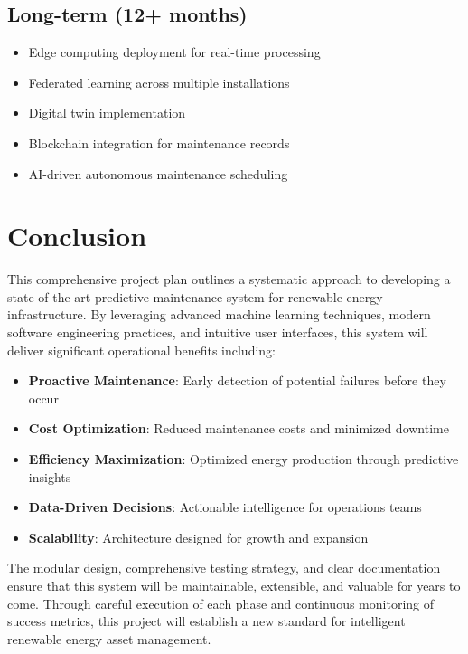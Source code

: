 \documentclass[12pt,a4paper]{article}
\begin{document}
\subsection{Long-term (12+ months)}
\begin{itemize}[leftmargin=*]
    \item Edge computing deployment for real-time processing
    \item Federated learning across multiple installations
    \item Digital twin implementation
    \item Blockchain integration for maintenance records
    \item AI-driven autonomous maintenance scheduling
\end{itemize}

\newpage

\section{Conclusion}

This comprehensive project plan outlines a systematic approach to developing a state-of-the-art predictive maintenance system for renewable energy infrastructure. By leveraging advanced machine learning techniques, modern software engineering practices, and intuitive user interfaces, this system will deliver significant operational benefits including:

\begin{itemize}[leftmargin=*]
    \item \textbf{Proactive Maintenance}: Early detection of potential failures before they occur
    \item \textbf{Cost Optimization}: Reduced maintenance costs and minimized downtime
    \item \textbf{Efficiency Maximization}: Optimized energy production through predictive insights
    \item \textbf{Data-Driven Decisions}: Actionable intelligence for operations teams
    \item \textbf{Scalability}: Architecture designed for growth and expansion
\end{itemize}

The modular design, comprehensive testing strategy, and clear documentation ensure that this system will be maintainable, extensible, and valuable for years to come. Through careful execution of each phase and continuous monitoring of success metrics, this project will establish a new standard for intelligent renewable energy asset management.
\end{document}
